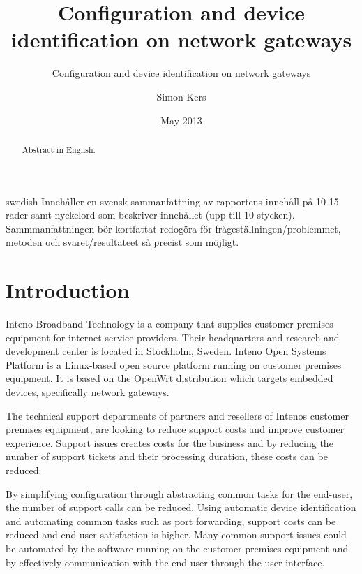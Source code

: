 \documentclass[a4paper,11pt]{kth-mag}
\title{Configuration and device identification on network gateways}
\subtitle{Configuration and device identification on network gateways}
\author{Simon Kers}
\date{May 2013}
\newcommand\blankpage{%
    \null
    \thispagestyle{empty}%
    \addtocounter{page}{-1}%
    \newpage}
\begin{document}
\frontmatter
{}
\setcounter{page}{3}
\pagestyle{center}

\maketitle
\thispagestyle{center}
\begin{abstract}
   Abstract in English.

\end{abstract}
\newpage
\blankpage

\begin{foreignabstract}{swedish}
   Innehåller en svensk sammanfattning av rapportens innehåll på 10-15 rader samt nyckelord som beskriver innehållet (upp till 10 stycken).
   Sammmanfattningen bör kortfattat redogöra för frågeställningen/problemmet, metoden och svaret/resultateet så precist som möjligt.

\newpage
\blankpage

\end{foreignabstract}
\clearpage
\tableofcontents*
\mainmatter
\pagestyle{newchap}
\chapter{Introduction}
Inteno Broadband Technology is a company that supplies customer premises equipment for internet service providers.  
Their headquarters and research and development center is located in Stockholm, Sweden.  
Inteno Open Systems Platform is a Linux-based open source platform running on customer premises equipment.
It is based on the OpenWrt distribution which targets embedded devices, specifically network gateways. \cite{Inteno}

The technical support departments of partners and resellers of Intenos
customer premises equipment, are looking to reduce support costs and improve customer experience. 
Support issues creates costs for the business and by reducing the number of support tickets and their processing duration, these costs can be reduced.

By simplifying configuration through abstracting common tasks for the end-user, the number of support calls can be reduced.
Using automatic device identification and automating common tasks such as port forwarding, support costs can be reduced and end-user satisfaction is higher.
Many common support issues could be automated by the software running on the customer premises equipment and by effectively communication with the end-user through the user interface.
\end{document}
